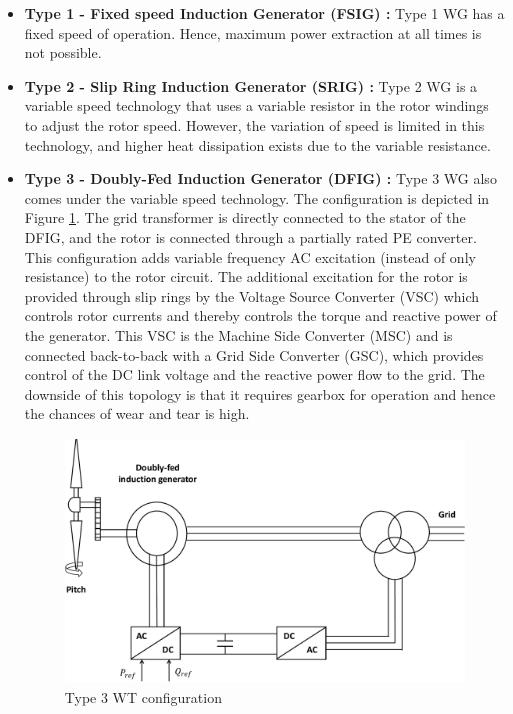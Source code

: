 \begin{itemize}
    \item \textbf{Type 1 - Fixed speed Induction Generator (FSIG) :} Type 1 \gls{WG} has a fixed speed of operation. Hence, maximum power extraction at all times is not possible.
    \item \textbf{Type 2 - Slip Ring Induction Generator (SRIG) :} Type 2 \gls{WG} is a variable speed technology that uses a variable resistor in the rotor windings to adjust the rotor speed. However, the variation of speed is limited in this technology, and higher heat dissipation exists due to the variable resistance.
    \item \textbf{Type 3 - Doubly-Fed Induction Generator (DFIG) :} Type 3 \gls{WG} also comes under the variable speed technology. The configuration is depicted in Figure \ref{fig:Type3}. The grid transformer is directly connected to the stator of the DFIG, and the rotor is connected through a partially rated \gls{PE} converter. This configuration adds variable frequency \gls{AC} excitation (instead of only resistance) to the rotor circuit. The additional excitation for the rotor is provided through slip rings by the Voltage Source Converter (\gls{VSC}) which controls rotor currents and thereby controls the torque and reactive power of the generator. This \gls{VSC} is the Machine Side Converter (\gls{MSC}) and is connected back-to-back with a Grid Side Converter (\gls{GSC}), which provides control of the \gls{DC} link voltage and the reactive power flow to the grid. The downside of this topology is that it requires gearbox for operation and hence the chances of wear and tear is high.
    
    \begin{figure}[H]
\centering
    \includegraphics[height = 6.5cm,width = 12cm]{Diagrams/Chapter_2/Type3WT_new.pdf}
    \caption{Type 3 WT configuration \cite{ali_wind_2012}}
    \label{fig:Type3}
\end{figure}
    

\end{itemize}
